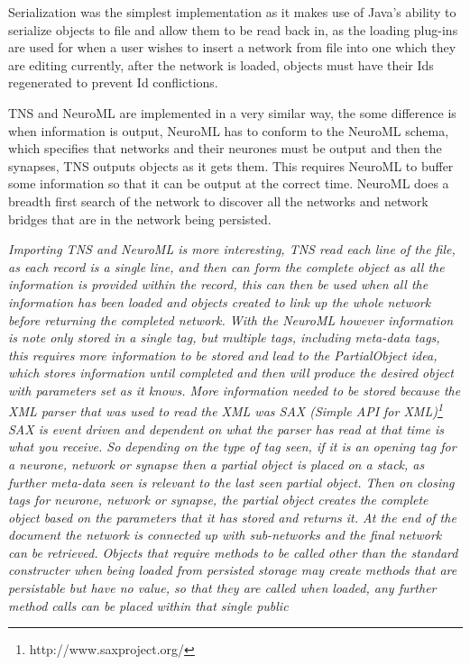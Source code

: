 \documentclass[12pt,twoside]{article}
\begin{document}
\bigskip

{\mdseries\upshape
Serialization was the simplest implementation as it makes use of
Java's ability to serialize objects to file and allow
them to be read back in, as the loading plug{}-ins are used for when a
user wishes to insert a network from file into one which they are
editing currently, after the network is loaded, objects must have their
Ids regenerated to prevent Id conflictions.}


\bigskip

{\mdseries\upshape
TNS and NeuroML are implemented in a very similar way, the some
difference is when information is output, NeuroML has to conform to the
NeuroML schema, which specifies that networks and their neurones must
be output and then the synapses, TNS outputs objects as it gets them.
This requires NeuroML to buffer some information so that it can be
output at the correct time. NeuroML does a breadth first search of the
network to discover all the networks and network bridges that are in
the network being persisted.}


\bigskip

{\mdseries\itshape
\textup{Importing TNS and NeuroML is more interesting, TNS read each
line of the file, as each record is a single line, and then can form
the complete object as all the information is provided within the
record, this can then be used when all the information has been loaded
and objects created to link up the whole network before returning the
completed network. With the NeuroML however information is note only
stored in a single tag, but multiple tags, including meta{}-data tags,
this requires more information to be stored and lead to the
}PartialObject\textup{ idea, which stores information until completed
and then will produce the desired object with parameters set as it
knows. More information needed to be stored because the XML parser that
was used to read the XML was SAX (Simple API for
XML)}\footnote{http://www.saxproject.org/}\textup{ SAX is event driven
and dependent on what the parser has read at that time is what you
receive. So depending on the type of tag seen, if it is an opening tag
for a neurone, network or synapse then a partial object is placed on a
stack, as further meta{}-data seen is relevant to the last seen partial
object. Then on closing tags for neurone, network or synapse, the
partial object creates the complete object based on the parameters that
it has stored and returns it. At the end of the document the network is
connected up with sub{}-networks and the final network can be
retrieved. Objects that require methods to be called other than the
standard constructer when being loaded from persisted storage may
create methods that are persistable but have no value, so that they are
called when loaded, any further method calls can be placed within that
single public }}
\end{document}
